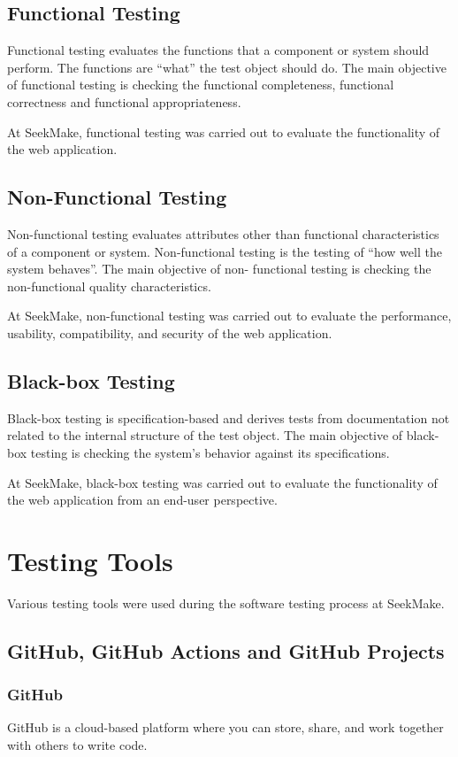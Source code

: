 \subsection{Functional Testing}
Functional testing evaluates the functions that a component or system should perform. The functions
are “what” the test object should do. The main objective of functional testing is checking the functional
completeness, functional correctness and functional appropriateness. \cite{istqbctfl4.0.1}

At SeekMake, functional testing was carried out to evaluate the functionality of the web application.
\subsection{Non-Functional Testing}
Non-functional testing evaluates attributes other than functional characteristics of a component or
system. Non-functional testing is the testing of “how well the system behaves”. The main objective of non-
functional testing is checking the non-functional quality characteristics. \cite{istqbctfl4.0.1}

At SeekMake, non-functional testing was carried out to evaluate the performance, usability, compatibility, and security of the web application.
\subsection{Black-box Testing}
Black-box testing is specification-based and derives tests from documentation not
related to the internal structure of the test object. The main objective of black-box testing is checking the
system's behavior against its specifications. \cite{istqbctfl4.0.1}

At SeekMake, black-box testing was carried out to evaluate the functionality of the web application from an end-user perspective.
\section{Testing Tools}
Various testing tools were used during the software testing process at SeekMake.
\subsection{GitHub, GitHub Actions and GitHub Projects}
\subsubsection{GitHub}
GitHub is a cloud-based platform where you can store, share, and work together with others to write code. \cite{github}

